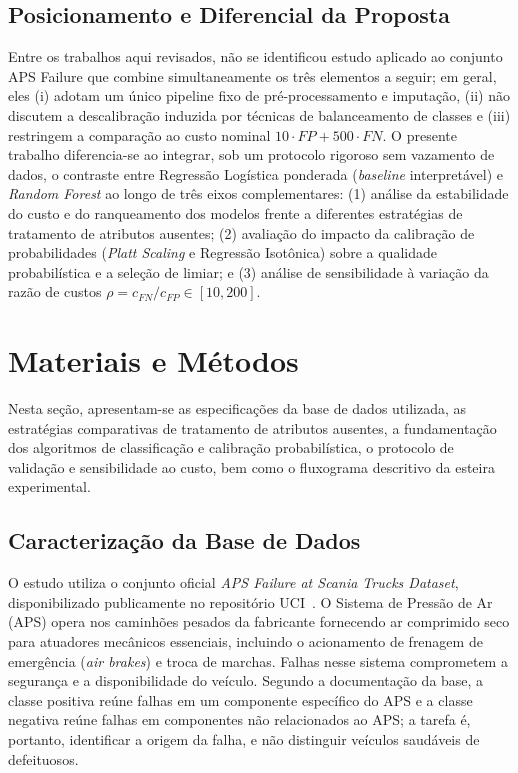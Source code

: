 \documentclass[conference]{IEEEtran}
\begin{document}
\subsection{Posicionamento e Diferencial da Proposta}

Entre os trabalhos aqui revisados, não se identificou estudo aplicado ao conjunto APS Failure que combine simultaneamente os três elementos a seguir; em geral, eles (i) adotam um único pipeline fixo de pré-processamento e imputação, (ii) não discutem a descalibração induzida por técnicas de balanceamento de classes e (iii) restringem a comparação ao custo nominal $10 \cdot FP + 500 \cdot FN$. O presente trabalho diferencia-se ao integrar, sob um protocolo rigoroso sem vazamento de dados, o contraste entre Regressão Logística ponderada (\textit{baseline} interpretável) e \textit{Random Forest} ao longo de três eixos complementares: (1) análise da estabilidade do custo e do ranqueamento dos modelos frente a diferentes estratégias de tratamento de atributos ausentes; (2) avaliação do impacto da calibração de probabilidades (\textit{Platt Scaling} e Regressão Isotônica) sobre a qualidade probabilística e a seleção de limiar; e (3) análise de sensibilidade à variação da razão de custos $\rho = c_{FN}/c_{FP} \in [10, 200]$.

\section{Materiais e Métodos}
\label{sec:metodologia}

Nesta seção, apresentam-se as especificações da base de dados utilizada, as estratégias comparativas de tratamento de atributos ausentes, a fundamentação dos algoritmos de classificação e calibração probabilística, o protocolo de validação e sensibilidade ao custo, bem como o fluxograma descritivo da esteira experimental.

\subsection{Caracterização da Base de Dados}

O estudo utiliza o conjunto oficial \textit{APS Failure at Scania Trucks Dataset}, disponibilizado publicamente no repositório UCI~\cite{scania_dataset}. O Sistema de Pressão de Ar (APS) opera nos caminhões pesados da fabricante fornecendo ar comprimido seco para atuadores mecânicos essenciais, incluindo o acionamento de frenagem de emergência (\textit{air brakes}) e troca de marchas. Falhas nesse sistema comprometem a segurança e a disponibilidade do veículo. Segundo a documentação da base, a classe positiva reúne falhas em um componente específico do APS e a classe negativa reúne falhas em componentes não relacionados ao APS; a tarefa é, portanto, identificar a origem da falha, e não distinguir veículos saudáveis de defeituosos.
\end{document}
